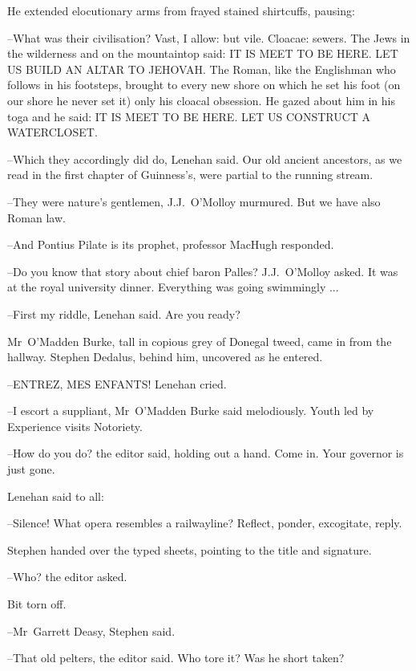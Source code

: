 He extended elocutionary arms from frayed stained shirtcuffs,
pausing:

--What was their civilisation?
Vast, I allow:
but vile.
Cloacae: sewers.
The Jews in the wilderness and on the mountaintop said:
IT IS MEET TO BE HERE.
LET US BUILD AN ALTAR TO JEHOVAH.
The Roman,
like the Englishman who follows in his footsteps,
brought to every new shore on which he set his foot
(on our shore he never set it)
only his cloacal obsession.
He gazed about him in his toga
and he said:
IT IS MEET TO BE HERE.
LET US CONSTRUCT A WATERCLOSET.

--Which they accordingly did do,
Lenehan said.
Our old ancient ancestors,
as we read in the first chapter of Guinness's,
were partial to the running stream.

--They were nature's gentlemen,
J.J.~O'Molloy murmured.
But we have also Roman law.

--And Pontius Pilate is its prophet,
professor MacHugh responded.

--Do you know that story about chief baron Palles?
J.J.~O'Molloy asked.
It was at the royal university dinner.
Everything was going swimmingly ...

--First my riddle,
Lenehan said.
Are you ready?

Mr~O'Madden Burke,
tall in copious grey of Donegal tweed,
came in from the hallway.
Stephen Dedalus,
behind him,
uncovered as he entered.

--ENTREZ, MES ENFANTS!
Lenehan cried.

--I escort a suppliant,
Mr~O'Madden Burke said melodiously.
Youth led by Experience visits Notoriety.

--How do you do?
the editor said,
holding out a hand.
Come in.
Your governor is just gone.



Lenehan said to all:

--Silence!
What opera resembles a railwayline?
Reflect,
ponder,
excogitate,
reply.

Stephen handed over the typed sheets,
pointing to the title and signature.

--Who?
the editor asked.

Bit torn off.

--Mr~Garrett Deasy,
Stephen said.

--That old pelters,
the editor said.
Who tore it?
Was he short taken?



